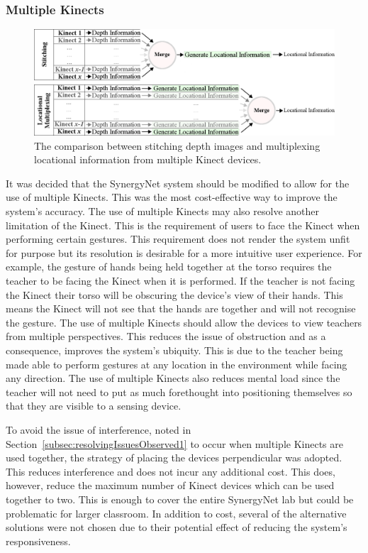 \documentclass[link]{IWCOMP}
\begin{document}
\subsubsection{Multiple Kinects} 
\label{subsubsec:studyImplementationMultipleKinects}

\begin{figure}[t]
  \centering
  \includegraphics[width=1\textwidth]{figures/multiplexing_flow_diagram.png}
  \caption{The comparison between stitching depth images and multiplexing locational information from multiple Kinect devices.}
  \label{fig:multiplexing}
\end{figure}

It was decided that the SynergyNet system should be modified to allow for the use of multiple Kinects.
This was the most cost-effective way to improve the system's accuracy.
The use of multiple Kinects may also resolve another limitation of the Kinect.
This is the requirement of users to face the Kinect when performing certain gestures.
This requirement does not render the system unfit for purpose but its resolution is desirable for a more intuitive user experience.
For example, the gesture of hands being held together at the torso requires the teacher to be facing the Kinect when it is performed.
If the teacher is not facing the Kinect their torso will be obscuring the device's view of their hands.
This means the Kinect will not see that the hands are together and will not recognise the gesture.
The use of multiple Kinects should allow the devices to view teachers from multiple perspectives.
This reduces the issue of obstruction and as a consequence, improves the system's ubiquity.
This is due to the teacher being made able to perform gestures at any location in the environment while facing any direction.
The use of multiple Kinects also reduces mental load since the teacher will not need to put as much forethought into positioning themselves so that they are visible to a sensing device.

To avoid the issue of interference, noted in Section~\ref{subsec:resolvingIssuesObserved1} to occur when multiple Kinects are used together, the strategy of placing the devices perpendicular was adopted.
This reduces interference and does not incur any additional cost.
This does, however, reduce the maximum number of Kinect devices which can be used together to two.
This is enough to cover the entire SynergyNet lab but could be problematic for larger classroom.
In addition to cost, several of the alternative solutions were not chosen due to their potential effect of reducing the system's responsiveness.
\end{document}
